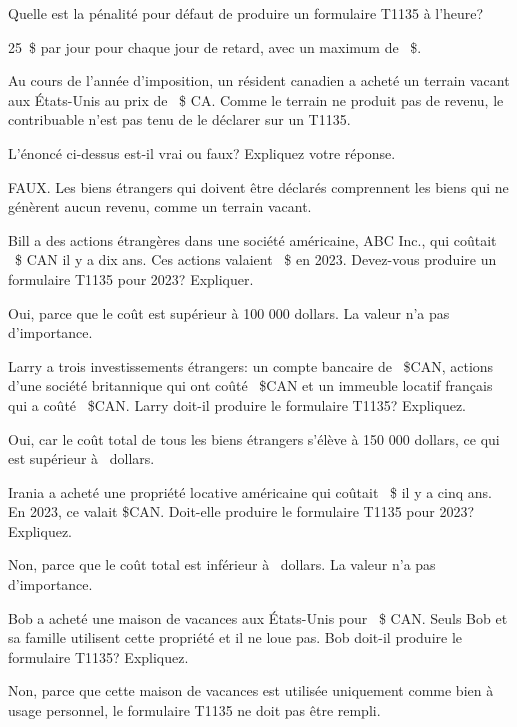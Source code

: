 \begin{question}
	Quelle est la pénalité pour défaut de produire un formulaire T1135 à l'heure?
\end{question}
25~\$ par jour pour chaque jour de retard, avec un maximum de
~\$.

\begin{question}
	Au cours de l'année d'imposition, un résident canadien a acheté un terrain vacant aux États-Unis au prix de ~\$ CA. Comme le terrain ne produit pas de revenu, le contribuable n'est pas tenu de le déclarer sur un T1135.
	
	L'énoncé ci-dessus est-il vrai ou faux? Expliquez votre réponse.
\end{question}
FAUX. Les biens étrangers qui doivent être déclarés comprennent les biens qui ne génèrent aucun revenu, comme un terrain vacant.

\begin{question}
	Bill a des actions étrangères dans une société américaine, ABC Inc., qui coûtait ~\$ CAN il y a dix ans. Ces actions valaient ~\$ en 2023. Devez-vous produire un formulaire T1135 pour 2023? Expliquer.
\end{question}
Oui, parce que le coût est supérieur à 100 000 dollars. La valeur n'a pas d'importance.

\begin{question}
	Larry a trois investissements étrangers: un compte bancaire de ~\$CAN, actions d'une société britannique qui ont coûté ~\$CAN et un immeuble locatif français qui a coûté ~\$CAN. Larry doit-il produire le formulaire T1135? Expliquez.
\end{question}
Oui, car le coût total de tous les biens étrangers s'élève à 150 000 dollars, ce qui est supérieur à ~dollars.

\begin{question}
	Irania a acheté une propriété locative américaine qui coûtait ~\$ il y a cinq ans. En 2023, ce valait \$CAN. Doit-elle produire le formulaire T1135 pour 2023? Expliquez.
\end{question}
Non, parce que le coût total est inférieur à ~dollars. La valeur n'a pas d'importance.

\begin{question}
	Bob a acheté une maison de vacances aux États-Unis pour ~\$ CAN. Seuls Bob et sa famille utilisent cette propriété et il ne loue pas. Bob doit-il produire le formulaire T1135? Expliquez.
\end{question}
Non, parce que cette maison de vacances est utilisée uniquement comme bien à usage personnel, le formulaire T1135 ne doit pas être rempli.



